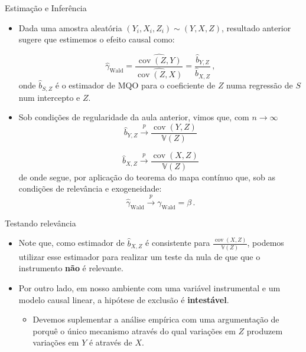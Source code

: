 \documentclass[11pt]{beamer}
\begin{document}
\begin{frame}{Estimação e Inferência}
	\begin{itemize}
		\item Dada uma amostra aleatória $(Y_i,X_i,Z_i)\sim (Y,X,Z)$, resultado anterior sugere que estimemos o efeito causal como:
		
		$$\hat{\gamma}_{\text{Wald}} = \frac{\widehat{\operatorname{cov}(Z,Y)}}{\widehat{\operatorname{cov}(Z,X)}} = \frac{\hat{b}_{Y,Z}}{\hat{b}_{X,Z}}\, ,$$
		onde $\hat{b}_{S,Z}$ é o estimador de MQO para o coeficiente de $Z$ numa regressão de $S$ num intercepto e $Z$.
		\item Sob condições de regularidade da aula anterior, vimos que, com $n \to \infty$ $$\hat{b}_{Y,Z} \overset{p}{\to} \frac{\operatorname{cov}(Y,Z)}{\mathbb{V}(Z)}$$
		
		$$\hat{b}_{X,Z} \overset{p}{\to} \frac{\operatorname{cov}(X,Z)}{\mathbb{V}(Z)}$$
		de onde segue, por aplicação do teorema do mapa contínuo que, sob as condições de relevância e exogeneidade:
		\vspace{-0.2em}
		$$\hat{\gamma}_{\text{Wald}}  \overset{p}{\to} \gamma_{\text{Wald}} = \beta\, .$$
		
	\end{itemize}
\end{frame}
\begin{frame}{Testando relevância}
	\begin{itemize}
		\item Note que, como estimador de $\hat{b}_{X,Z}$ é consistente para $\frac{\operatorname{cov}(X,Z)}{\mathbb{V}(Z)}$, podemos utilizar esse estimador para realizar um teste da nula de que que o {instrumento} \textbf{não} é relevante.
		\item Por outro lado, em nosso ambiente com uma variável instrumental e um modelo causal linear, a hipótese de {exclusão} é \textbf{intestável}.
		\begin{itemize}
			\item Devemos suplementar a análise empírica com uma argumentação de porquê o único mecanismo através do qual variações em $Z$ produzem variações em $Y$ é através de $X$.
		\end{itemize}
	\end{itemize}
\end{frame}
\end{document}
